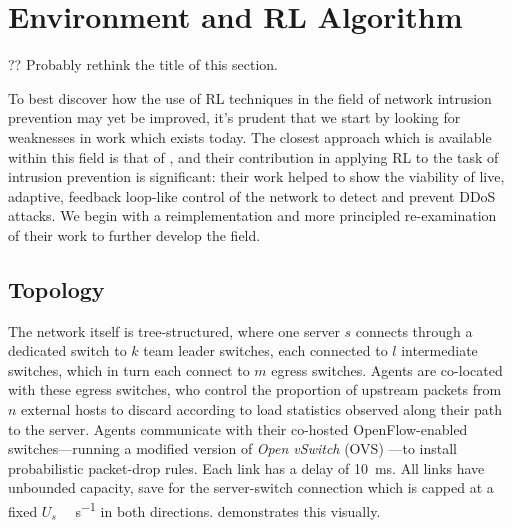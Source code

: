 \documentclass[conference, letterpaper, 10pt, times]{IEEEtran}
\begin{document}
\section{Environment and RL Algorithm}\label{sec:environment-and-rl-algorithm}

?? Probably rethink the title of this section.

To best discover how the use of RL techniques in the field of network intrusion prevention may yet be improved, it's prudent that we start by looking for weaknesses in work which exists today.
The closest approach which is available within this field is that of \textcite{DBLP:journals/eaai/MalialisK15}, and their contribution in applying RL to the task of intrusion prevention is significant: their work helped to show the viability of live, adaptive, feedback loop-like control of the network to detect and prevent DDoS attacks.
We begin with a reimplementation and more principled re-examination of their work to further develop the field.



\subsection{Topology}

The network itself is tree-structured, where one server $s$ connects through a dedicated switch to $k$ team leader switches, each connected to $l$ intermediate switches, which in turn each connect to $m$ egress switches.
Agents are co-located with these egress switches, who control the proportion of upstream packets from $n$ external hosts to discard according to load statistics observed along their path to the server.
Agents communicate with their co-hosted OpenFlow-enabled switches---running a modified version of \emph{Open vSwitch} (OVS) \cite{open-vswitch}---to install probabilistic packet-drop rules.
Each link has a delay of \SI{10}{\milli\second}.
All links have unbounded capacity, save for the server-switch connection which is capped at a fixed $U_s$ \si{\mega\bit\per\second} in both directions.
 demonstrates this visually.
\end{document}

